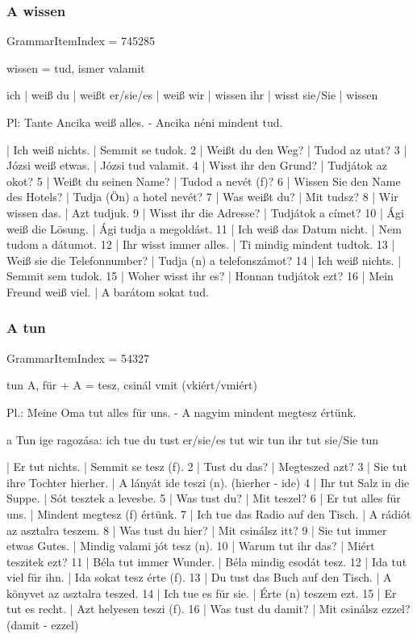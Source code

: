 \documentclass{article}
\newenvironment{desc}{\verbatim}{\endverbatim}
\newenvironment{exmp}{\verbatim}{\endverbatim}
\begin{document}
\subsubsection{A wissen}

GrammarItemIndex = 745285

\begin{desc}
wissen = tud, ismer valamit

ich       | weiß
du        | weißt
er/sie/es | weiß
wir       | wissen
ihr       | wisst
sie/Sie   | wissen

Pl: Tante Ancika weiß alles. - Ancika néni mindent tud.
\end{desc}

\begin{exmp}
1 | Ich weiß nichts. | Semmit se tudok.
2 | Weißt du den Weg? | Tudod az utat?
3 | Józsi weiß etwas. | Józsi tud valamit.
4 | Wisst ihr den Grund? | Tudjátok az okot?
5 | Weißt du seinen Name? | Tudod a nevét (f)?
6 | Wissen Sie den Name des Hotels? | Tudja (Ön) a hotel nevét?
7 | Was weißt du? | Mit tudsz?
8 | Wir wissen das. | Azt tudjuk.
9 | Wisst ihr die Adresse? | Tudjátok a címet?
10 | Ági weiß die Lösung. | Ági tudja a megoldást.
11 | Ich weiß das Datum nicht. | Nem tudom a dátumot.
12 | Ihr wisst immer alles. | Ti mindig mindent tudtok.
13 | Weiß sie die Telefonnumber? | Tudja (n) a telefonszámot?
14 | Ich weiß nichts. | Semmit sem tudok.
15 | Woher wisst ihr es? | Honnan tudjátok ezt?
16 | Mein Freund weiß viel. | A barátom sokat tud.
\end{exmp}

\subsubsection{A tun}

GrammarItemIndex = 54327

\begin{desc}
tun A, für + A = tesz, csinál vmit (vkiért/vmiért)

Pl.: Meine Oma tut alles für uns. - A nagyim mindent megtesz értünk.

a Tun ige ragozása:
ich tue
du tust
er/sie/es tut
wir tun
ihr tut
sie/Sie tun
\end{desc}

\begin{exmp}
1 | Er tut nichts. | Semmit se tesz (f).
2 | Tust du das? | Megteszed azt?
3 | Sie tut ihre Tochter hierher. | A lányát ide teszi (n). (hierher - ide)
4 | Ihr tut Salz in die Suppe. | Sót tesztek a levesbe.
5 | Was tust du? | Mit teszel?
6 | Er tut alles für uns. | Mindent megtesz (f) értünk.
7 | Ich tue das Radio auf den Tisch. | A rádiót az asztalra teszem.
8 | Was tust du hier? | Mit csinálsz itt?
9 | Sie tut immer etwas Gutes. | Mindig valami jót tesz (n).
10 | Warum tut ihr das? | Miért teszitek ezt?
11 | Béla tut immer Wunder. | Béla mindig csodát tesz.
12 | Ida tut viel für ihn. | Ida sokat tesz érte (f).
13 | Du tust das Buch auf den Tisch. | A könyvet az asztalra teszed.
14 | Ich tue es für sie. | Érte (n) teszem ezt.
15 | Er tut es recht. | Azt helyesen teszi (f).
16 | Was tust du damit? | Mit csinálsz ezzel? (damit - ezzel)
\end{exmp}
\end{document}
